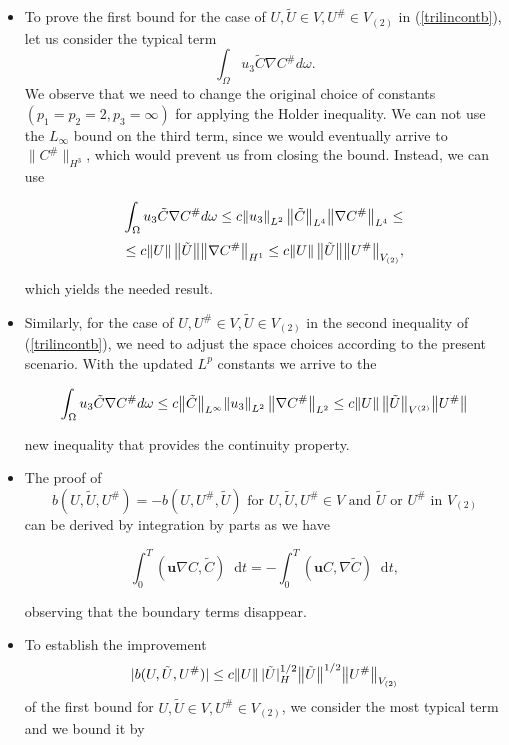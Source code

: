 \documentclass[11pt]{article}
\newcommand*\diff{\mathop{}\!\mathrm{d}}
\begin{document}
\begin{itemize}

  \item To prove the first bound for the case of $U, \tilde{U} \in V, U^\# \in V_{(2)}$ in (\ref{trilincontb}), let us consider the typical term $$ \int_\Omega u_3 \tilde{C} \nabla C^\# d \omega.$$ We observe that we need to change the original choice of constants $(p_1 = p_2 = 2, p_3 = \infty)$ for applying the Holder inequality. We can not use the $L_\infty$ bound on the third term, since we would eventually arrive to $\big \| C^\# \big \| _{H^3}$, which would prevent us from closing the bound. Instead, we can use
  
  \[ \int_\Omega u_3 \tilde{C} \nabla C^\# d \omega \leq c  \norm{u_3}_{L^2} \big \| \tilde{C} \big \| _{L^4} \big \| \nabla C^\# \big \| _{L^4} \leq \]
  \[ \leq c  \norm{U} \big \|\tilde{U}\big \|  \big \|\nabla C^\#  \big \|_{H^1} \leq c \norm{U} \big \|\tilde{U}\big \| \big \| U^\# \big \|_{V_{(2)}}, \]
  
  which yields the needed result.
  
  \item Similarly, for the case of $U, U^\#  \in V, \tilde{U} \in V_{(2)}$ in the second inequality of (\ref{trilincontb}), we need to adjust the space choices according to the present scenario. With the updated $L^p$ constants we arrive to the
  
  \[ \int_\Omega u_3 \tilde{C} \nabla C^\# d \omega \leq c  \big \| \tilde{C} \big \| _{L^\infty} \norm{ u_3}_{L^2}\big \| \nabla C^\# \big \| _{L^2}  \leq c \norm{U} \big \|\tilde{U}\big \| _{V^{(2)}} \big \| U^\# \big \| \]
  
  new inequality that provides the continuity property.
  
  \item The proof of $$b(U, \tilde{U}, U^\# ) = - b(U, U^\#, \tilde{U} ) \text{ for } U, \tilde{U}, U^\# \in V \text{ and } \tilde{U} \text{ or } U^\# \text{ in } V_{(2)}$$ can be derived by integration by parts as we have
  
  \[ \int_0 ^T  (\mathbf{u} \nabla C, \tilde{C}) \diff t =  - \int_0 ^T  ( \mathbf{u} C, \nabla \tilde{C}) \diff t, \]
  
  observing that the boundary terms disappear.
  
  \item To establish the improvement $$ \lvert b(U, \tilde{U}, U^\#) \rvert  \leq c   \norm{U}   \lvert \tilde{U} \rvert _H^{1/2}     \big \| \tilde{U} \big \| ^{1/2}    \big \| U^\# \big \| _{V_{(2)}}     $$ of the first bound for $U, \tilde{U} \in V, U^{\#} \in V_{(2)}$, we consider the most typical term and we bound it by
  

\end{itemize}
\end{document}
